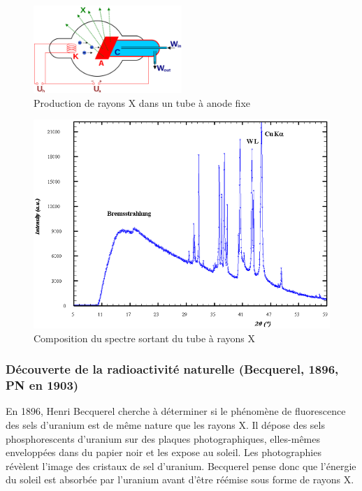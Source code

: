 \begin{figure}[ht]
    \centering
    \includegraphics[width=0.5\textwidth]{Images1/rayonsxtube.png}
    \caption{Production de rayons X dans un tube à anode fixe}
    \label{fig:tube_rayon_x}
\end{figure}

\begin{figure}[ht]
    \centering
    \includegraphics[scale=0.30]{Images1/rayonnement.PNG}
    \caption{Composition du spectre sortant du tube à rayons X}
    \label{fig:spectre_rayon_x}
\end{figure}

\subsubsection{Découverte de la radioactivité naturelle (Becquerel, 1896, PN en 1903)}
En 1896, Henri Becquerel cherche à déterminer si le phénomène de fluorescence des sels d'uranium est de même nature que les rayons X. Il dépose des sels phosphorescents d'uranium sur des plaques photographiques, elles-mêmes enveloppées dans du papier noir et les expose au soleil. Les photographies révèlent l'image des cristaux de sel d'uranium. Becquerel pense donc que l'énergie du soleil est absorbée par l'uranium avant d'être réémise sous forme de rayons X.


